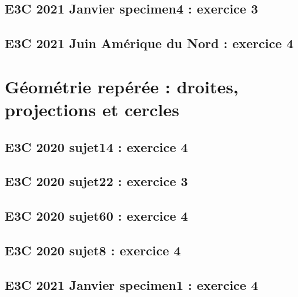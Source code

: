 \documentclass[lang=fr,edition=teacher,layout=sheet]{mxbook}
\begin{document}
\begingroup\endgroup
\par\bigskip
{}\subsection*{E3C 2021 Janvier specimen4 : exercice 3}
\begingroup\endgroup
\par\bigskip
{}\subsection*{E3C 2021 Juin Amérique du Nord : exercice 4}
\begingroup\endgroup
\par\bigskip
\clearpage\section*{Géométrie repérée : droites, projections et cercles}
\subsection*{E3C 2020 sujet14 : exercice 4}
\begingroup\endgroup
\par\bigskip
{}\subsection*{E3C 2020 sujet22 : exercice 3}
\begingroup\endgroup
\par\bigskip
{}\subsection*{E3C 2020 sujet60 : exercice 4}
\begingroup\endgroup
\par\bigskip
{}\subsection*{E3C 2020 sujet8 : exercice 4}
\begingroup\endgroup
\par\bigskip
{}\subsection*{E3C 2021 Janvier specimen1 : exercice 4}
\end{document}
